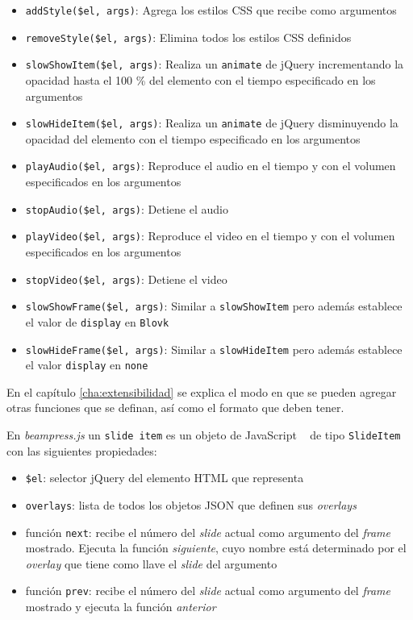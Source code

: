 			\begin{itemize}
				\item \texttt{addStyle(\$el, args)}: Agrega los estilos CSS que recibe como argumentos
				\item \texttt{removeStyle(\$el, args)}: Elimina todos los estilos CSS definidos
				\item \texttt{slowShowItem(\$el, args)}: Realiza un \texttt{animate} de jQuery incrementando la opacidad hasta el 100 \% del elemento con el tiempo especificado en los argumentos
				\item \texttt{slowHideItem(\$el, args)}: Realiza un \texttt{animate} de jQuery disminuyendo la opacidad del elemento con el tiempo especificado en los argumentos
				\item \texttt{playAudio(\$el, args)}: Reproduce el audio en el tiempo y con el volumen especificados en los argumentos
				\item \texttt{stopAudio(\$el, args)}: Detiene el audio
				\item \texttt{playVideo(\$el, args)}: Reproduce el video en el tiempo y con el volumen especificados en los argumentos
				\item \texttt{stopVideo(\$el, args)}: Detiene el video
				\item \texttt{slowShowFrame(\$el, args)}: Similar a \texttt{slowShowItem} pero además establece el valor de \texttt{display} en \texttt{Blovk}
				\item \texttt{slowHideFrame(\$el, args)}: Similar a \texttt{slowHideItem} pero además establece el valor \texttt{display} en \texttt{none}				
			\end{itemize}
			En el capítulo \ref{cha:extensibilidad} se explica el modo en que se pueden agregar otras funciones que se definan, así como el formato que deben tener.

			En \textit{beampress.js} un \texttt{slide item} es un objeto de JavaScript ~\cite{book:1047044} de tipo \texttt{SlideItem} con las siguientes propiedades:

			\begin{itemize}
			\label{it:slide_item}
			 	\item \texttt{\$el}: selector jQuery del elemento HTML que representa
			 	\item \texttt{overlays}: lista de todos los objetos JSON que definen sus \textit{overlays}
			 	\item función \texttt{next}: recibe el número del \textit{slide} actual como argumento del \textit{frame} mostrado. Ejecuta la función \textit{siguiente}, cuyo nombre está determinado por el \textit{overlay} que tiene como llave el \textit{slide} del argumento 
			 	\item función \texttt{prev}: recibe el número del \textit{slide} actual como argumento del \textit{frame} mostrado y ejecuta la función \textit{anterior}			 	
			 \end{itemize} 
				
